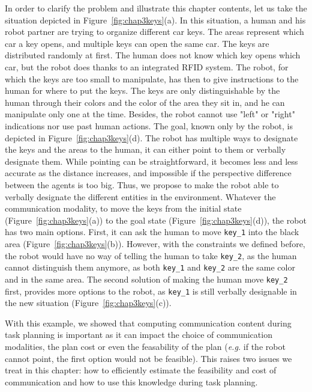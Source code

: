 \documentclass[a4paper,11pt,twoside]{StyleThese}
\begin{document}
In order to clarify the problem and illustrate this chapter contents, let us take the situation depicted in Figure~\ref{fig:chap3keys}(a). In this situation, a human and his robot partner are trying to organize different car keys. The areas represent which car a key opens, and multiple keys can open the same car. The keys are distributed randomly at first. The human does not know which key opens which car, but the robot does thanks to an integrated RFID system. The robot, for which the keys are too small to manipulate, has then to give instructions to the human for where to put the keys. The keys are only distinguishable by the human through their colors and the color of the area they sit in, and he can manipulate only one at the time. Besides, the robot cannot use "left" or "right" indications nor use past human actions.
The goal, known only by the robot, is depicted in Figure~\ref{fig:chap3keys}(d). The robot has multiple ways to designate the keys and the areas to the human, it can either point to them or verbally designate them. While pointing can be straightforward, it becomes less and less accurate as the distance increases, and impossible if the perspective difference between the agents is too big. Thus, we propose to make the robot able to verbally designate the different entities in the environment.
Whatever the communication modality, to move the keys from the initial state (Figure~\ref{fig:chap3keys}(a)) to the goal state (Figure~\ref{fig:chap3keys}(d)), the robot has two main options. First, it can ask the human to move \verb'key_1' into the black area (Figure~\ref{fig:chap3keys}(b)). However, with the constraints we defined before, the robot would have no way of telling the human to take \verb'key_2', as the human cannot distinguish them anymore, as both \verb'key_1' and \verb'key_2' are the same color and in the same area. The second solution of making the human move \verb'key_2' first, provides more options to the robot, as \verb'key_1' is still verbally designable in the new situation (Figure~\ref{fig:chap3keys}(c)).

With this example, we showed that computing communication content during task planning is important as it can impact the choice of communication modalities, the plan cost or even the feasability of the plan (\textit{e.g.} if the robot cannot point, the first option would not be feasible). This raises two issues we treat in this chapter: how to efficiently estimate the feasibility and cost of communication and how to use this knowledge during task planning.
\end{document}
